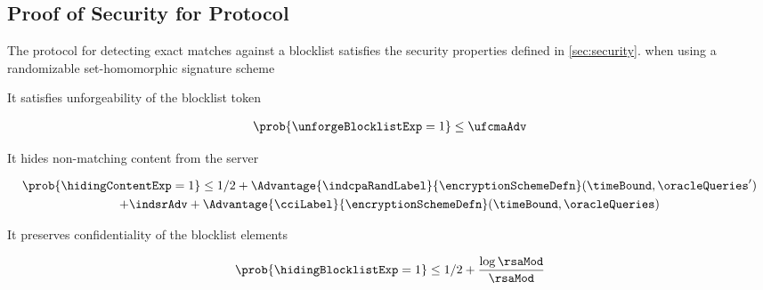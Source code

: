 
\iffalse 
\subsection{Proof of Security for Protocol \protocolEM}
\label{sec:proof:em}
%


\begin{theorem}
	\label{thm:proof:em}
	The protocol \protocolEM for detecting exact matches against a blocklist satisfies the security properties defined in \ref{sec:security}.
when using a randomizable set-homomorphic signature scheme \ourSigSchemeDefn 
	

	\enumListStart
	
	\item It satisfies unforgeability of the blocklist token 
	\begin{small}
	\begin{gather*}
    \prob{\unforgeBlocklistExp = 1} \le \ufcmaAdv
\end{gather*}
	\end{small}
	
	\item It hides non-matching content from the server 
	
	\begin{small}
					\begin{gather*}
			\prob{\hidingContentExp = 1} \le 1/2 + \Advantage{\indcpaRandLabel}{\encryptionSchemeDefn}(\timeBound, 
		\oracleQueries') \\  + \indsrAdv +  \Advantage{\cciLabel}{\encryptionSchemeDefn}(\timeBound, \oracleQueries) 
		\end{gather*}
		\end{small}
	
	\item It preserves confidentiality of the blocklist elements
	
	\begin{small}
				\begin{gather*}
				\prob{\hidingBlocklistExp = 1} \le 1/2 + \frac{\log \rsaMod}{\rsaMod}
			\end{gather*}
		\end{small}
	
	\enumListEnd  
\end{theorem}


